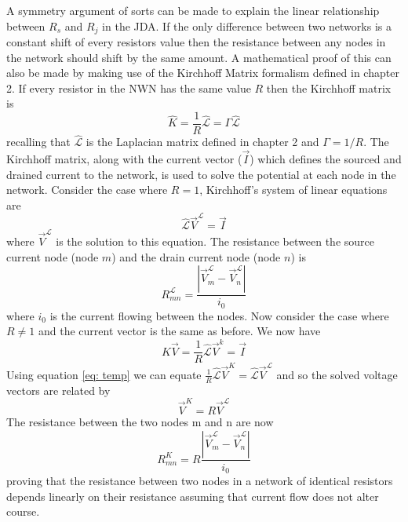 A symmetry argument of sorts can be made to explain the linear relationship between $R_s$ and $R_j$ in the JDA. If the only difference between two networks is a constant shift of every resistors value then the resistance between any nodes in the network should shift by the same amount. A mathematical proof of this can also be made by making use of the Kirchhoff Matrix formalism defined in chapter 2. If every resistor in the NWN has the same value $R$ then the Kirchhoff matrix is 
\begin{equation}
\hat{K} = \frac{1}{R} \hat{\mathcal{L}} = \Gamma \hat{\mathcal{L}}
\end{equation}
recalling that $\hat{\mathcal{L}}$ is the Laplacian matrix defined in chapter 2 and $\Gamma = 1/R$. The Kirchhoff matrix, along with the current vector ($\vec{I}$) which defines the sourced and drained current to the network, is used to solve the potential at each node in the network. Consider the case where $R = 1$, Kirchhoff's system of linear equations are
\begin{equation}
\hat{\mathcal{L}} \vec{V}^\mathcal{L} = \vec{I} 
\label{eq: temp}
\end{equation}
where $\vec{V}^\mathcal{L}$ is the solution to this equation. The resistance between the source current node (node $m$) and the drain current node (node $n$) is
\begin{equation}
R^{\mathcal{L}}_{mn} = \frac{| \vec{V}^\mathcal{L}_m - \vec{V}^\mathcal{L}_n|}{i_0}
\end{equation}
where $i_0$ is the current flowing between the nodes. Now consider the case where $R \neq 1$ and the current vector is the same as before. We now have
\begin{equation}
\hat{K}\vec{V} = \frac{1}{R}\hat{\mathcal{L}}\vec{V}^k = \vec{I}
\end{equation}
Using equation \ref{eq: temp} we can equate $ \frac{1}{R}\hat{\mathcal{L}}\vec{V}^K = \hat{\mathcal{L}}\vec{V}^\mathcal{L}$ and so the solved voltage vectors are related by
\begin{equation}
\vec{V}^K = R \vec{V}^\mathcal{L}
\end{equation}
The resistance between the two nodes m and n are now
\begin{equation}
R^K_{mn} = R \frac{| \vec{V}^\mathcal{L}_m - \vec{V}^\mathcal{L}_n|}{i_0}
\end{equation}
proving that the resistance between two nodes in a network of identical resistors depends linearly on their resistance assuming that current flow does not alter course.

